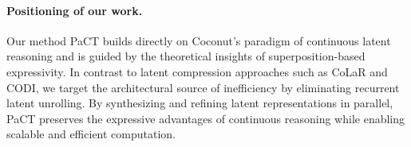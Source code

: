 \paragraph{Positioning of our work.}
Our method PaCT builds directly on Coconut’s paradigm of continuous latent reasoning and is guided by the theoretical insights of superposition-based expressivity. In contrast to latent compression approaches such as CoLaR and CODI, we target the architectural source of inefficiency by eliminating recurrent latent unrolling. By synthesizing and refining latent representations in parallel, PaCT preserves the expressive advantages of continuous reasoning while enabling scalable and efficient computation.
